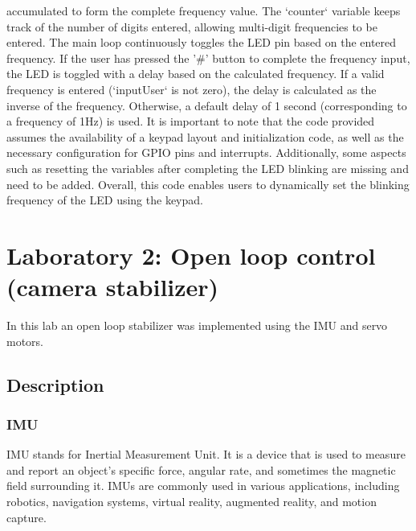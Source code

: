 \documentclass[english]{article}
\begin{document}
accumulated to form the complete frequency value. The `counter` variable keeps
 track of the number of digits entered, allowing multi-digit frequencies to be entered.
The main loop continuously toggles the LED pin based on the entered frequency.
 If the user has pressed the '\#' button to complete the frequency input, 
 the LED is toggled with a delay based on the calculated frequency. 
 If a valid frequency is entered (`inputUser` is not zero), the delay is
  calculated as the inverse of the frequency. Otherwise, a default delay of 
  1 second (corresponding to a frequency of 1Hz) is used.
It is important to note that the code provided assumes the availability of a
keypad layout and initialization code, as well as the necessary configuration 
for GPIO pins and interrupts. Additionally, some aspects such as resetting 
the variables after completing the LED blinking are missing and need to be added.
Overall, this code enables users to dynamically set the blinking frequency of
 the LED using the keypad.
\newpage
\section{Laboratory 2: Open loop control (camera stabilizer)}
In this lab an open loop stabilizer was implemented using the IMU and servo motors.
\subsection{Description}
\subsubsection{IMU}
IMU stands for Inertial Measurement Unit.
It is a device that is used 
to measure and report an object's specific force, angular rate, and 
sometimes the magnetic field surrounding it. IMUs are commonly used in
 various applications, including robotics, navigation systems, virtual 
 reality, augmented reality, and motion capture.\newline
\end{document}
